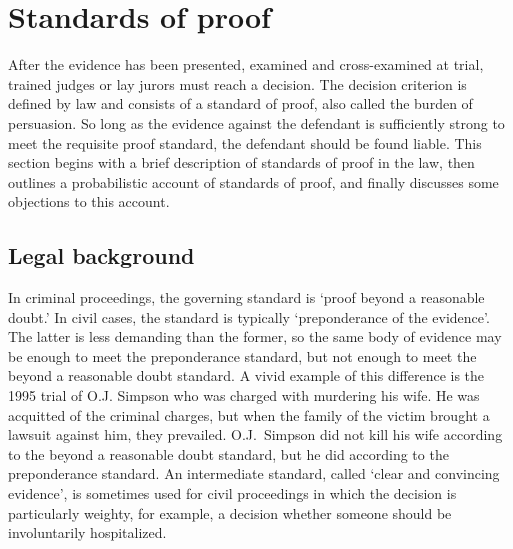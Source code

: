 \documentclass{article}
\begin{document}
\section{Standards of proof}
\label{sec:burden}

After the evidence has been presented, examined and cross-examined at trial, 
trained judges or lay jurors must reach a decision. 
The decision criterion is defined by law 
and consists of a standard of proof, also called the burden of persuasion. 
So long as the evidence against the defendant is sufficiently strong to meet the requisite proof standard, the defendant should be found liable. This section begins with a brief description of standards of proof in the law, then outlines a probabilistic account of standards of proof, and finally discusses some objections to this account. 



\subsection{Legal background}
\label{subsec:legal-background}

 
In criminal proceedings, the governing standard is `proof beyond a reasonable doubt.' In civil cases, the standard is typically `preponderance of the evidence'. The latter is less demanding than the former, so the same body of evidence may be enough to meet the preponderance standard, but not enough to meet the beyond a reasonable doubt standard. A vivid example of this difference is the 1995 trial of O.J. Simpson who was charged with murdering his wife. He was acquitted of the criminal charges, but when the family of the victim brought a lawsuit against him, they prevailed. O.J.\ Simpson did not kill his wife according to the beyond a reasonable doubt standard, but he did according to the preponderance standard. An intermediate standard, called `clear and convincing evidence', is sometimes used for civil proceedings in which the decision is particularly weighty, for example, a decision whether someone should be involuntarily hospitalized. 
\end{document}
